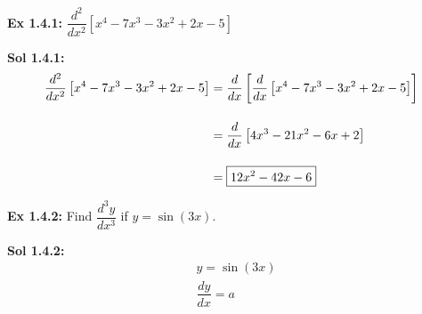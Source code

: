 \begin{tcolorbox}[example]
    \textbf{Ex 1.4.1: } $\dfrac{d^2}{dx^2} \left[x^4 - 7x^3 - 3x^2 + 2x - 5\right]$
\end{tcolorbox}
\begin{tcolorbox}[solution]
    \textbf{Sol 1.4.1: } \begin{align*}
        \dfrac{d^2}{dx^2} \left[x^4 - 7x^3 - 3x^2 + 2x - 5\right] &= \dfrac{d}{dx} \left[\dfrac{d}{dx} \left[x^4 - 7x^3 - 3x^2 + 2x - 5\right]\right] \\[11pt]
        & = \dfrac{d}{dx} \left[4x^3 - 21x^2 - 6x + 2\right] \\[11pt]
        & = \boxed{12x^2 - 42x - 6}
    \end{align*}
\end{tcolorbox} \vspace{11pt}

\begin{tcolorbox}[example]
    \textbf{Ex 1.4.2: } Find $\dfrac{d^3y}{dx^3}$ if $y = \sin (3x)$.
\end{tcolorbox} 
\begin{tcolorbox}[solution]
    \textbf{Sol 1.4.2: } \begin{align*}
        & y = \sin (3x) \\[11pt]
        & \dfrac{dy}{dx} = a
    \end{align*}
\end{tcolorbox}